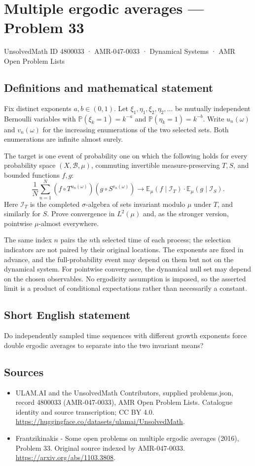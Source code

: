 \documentclass[11pt,a4paper]{article}
\begin{document}
\section*{Multiple ergodic averages — Problem 33}\label{4800033}
{\small UnsolvedMath ID 4800033 · AMR-047-0033 · Dynamical Systems · AMR Open Problem Lists}
\subsection{Definitions and mathematical statement}
Fix distinct exponents $a,b\in(0,1)$. Let
$\xi_1,\eta_1,\xi_2,\eta_2,\ldots$ be mutually
independent Bernoulli variables with
$\mathbb P(\xi_k=1)=k^{-a}$ and
$\mathbb P(\eta_k=1)=k^{-b}$.
Write $u_n(\omega)$ and $v_n(\omega)$ for
the increasing enumerations of the two selected
sets. Both enumerations are infinite almost surely.

The target is one event of probability one
on which the following holds for every
probability space $(X,\mathcal B,\mu)$, commuting
invertible measure-preserving $T,S$, and bounded
functions $f,g$:
\[
 \frac1N\sum_{n=1}^N
       (f\circ T^{u_n(\omega)})(g\circ S^{v_n(\omega)})
       \longrightarrow
       \mathbb E_\mu(f\mid\mathcal I_T)\cdot
       \mathbb E_\mu(g\mid\mathcal I_S).
\]
Here $\mathcal I_T$ is the completed
$\sigma$-algebra of sets invariant modulo $\mu$
under $T$, and similarly for $S$.
Prove convergence in $L^2(\mu)$ and, as
the stronger version, pointwise $\mu$-almost
everywhere.

The same index $n$ pairs the $n$th selected
time of each process; the selection indicators
are not paired by their original locations.
The exponents are fixed in advance, and
the full-probability event may depend on
them but not on the dynamical system.
For pointwise convergence, the dynamical null
set may depend on the chosen observables.
No ergodicity assumption is imposed, so
the asserted limit is a product of conditional
expectations rather than necessarily a constant.
\subsection{Short English statement}
Do independently sampled time sequences with different growth exponents force double ergodic averages to separate into the two invariant means?
\subsection{Sources}
\begin{itemize}
\item[S1] ULAM.AI and the UnsolvedMath Contributors, supplied problems.json, record 4800033 (AMR-047-0033), AMR Open Problem Lists. Catalogue identity and source transcription; CC BY 4.0.
\url{https://huggingface.co/datasets/ulamai/UnsolvedMath}.
\item[S2] Frantzikinakis - Some open problems on multiple ergodic averages (2016), Problem 33. Original source indexed by AMR-047-0033.
\url{https://arxiv.org/abs/1103.3808}.
\end{itemize}
\end{document}
